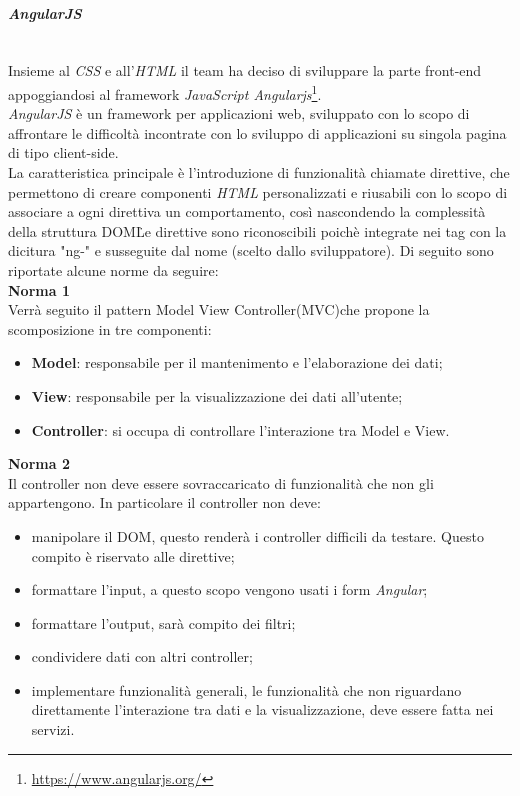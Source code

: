 \paragraph{\textit{AngularJS}} \label{angularjs} \-\\
Insieme al \textit{CSS} e all'\textit{HTML} il team ha deciso di sviluppare la parte front-end appoggiandosi al framework \textit{JavaScript Angularjs}\footnote{\url{https://www.angularjs.org/}}\glossario.\\
\textit{AngularJS} è un framework per applicazioni web, sviluppato con lo scopo di affrontare le difficoltà incontrate con lo sviluppo di applicazioni su singola pagina di tipo client-side. \-\\
La caratteristica principale è l'introduzione di funzionalità chiamate direttive, che permettono di creare componenti \textit{HTML} personalizzati e riusabili con lo scopo di associare a ogni direttiva un comportamento, così nascondendo la complessità della struttura DOM\glossario\. Le direttive sono riconoscibili poichè integrate nei tag con la dicitura "ng-" e susseguite dal nome (scelto dallo sviluppatore). 
Di seguito sono riportate alcune norme da seguire:\\
\textbf{Norma 1}\\
Verrà seguito il pattern Model View Controller(MVC)\glossario che propone la scomposizione in tre componenti:
\begin{itemize}
	\item \textbf{Model}: responsabile per il mantenimento e l'elaborazione dei dati;
	\item \textbf{View}: responsabile per la visualizzazione dei dati all'utente;
	\item \textbf{Controller}: si occupa di controllare l'interazione tra Model e View.
\end{itemize} 
\textbf{Norma 2}\\
Il controller non deve essere sovraccaricato di funzionalità che non gli appartengono. In particolare il controller non deve:
\begin{itemize}
	\item manipolare il DOM, questo renderà i controller difficili da testare. Questo compito è riservato alle direttive;
	\item formattare l'input, a questo scopo vengono usati i form \textit{Angular};
	\item formattare l'output, sarà compito dei filtri;
	\item condividere dati con altri controller;
	\item implementare funzionalità generali, le funzionalità che non riguardano direttamente l'interazione tra dati e la visualizzazione, deve essere fatta nei servizi.
\end{itemize}
